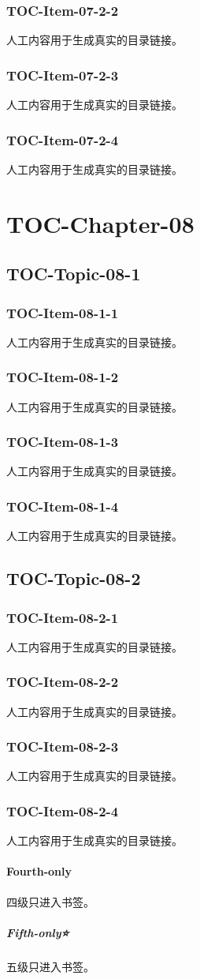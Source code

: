 \subsubsection{TOC-Item-07-2-2}
人工内容用于生成真实的目录链接。
\subsubsection{TOC-Item-07-2-3}
人工内容用于生成真实的目录链接。
\subsubsection{TOC-Item-07-2-4}
人工内容用于生成真实的目录链接。
\section{TOC-Chapter-08}
\subsection{TOC-Topic-08-1}
\subsubsection{TOC-Item-08-1-1}
人工内容用于生成真实的目录链接。
\subsubsection{TOC-Item-08-1-2}
人工内容用于生成真实的目录链接。
\subsubsection{TOC-Item-08-1-3}
人工内容用于生成真实的目录链接。
\subsubsection{TOC-Item-08-1-4}
人工内容用于生成真实的目录链接。
\subsection{TOC-Topic-08-2}
\subsubsection{TOC-Item-08-2-1}
人工内容用于生成真实的目录链接。
\subsubsection{TOC-Item-08-2-2}
人工内容用于生成真实的目录链接。
\subsubsection{TOC-Item-08-2-3}
人工内容用于生成真实的目录链接。
\subsubsection{TOC-Item-08-2-4}
人工内容用于生成真实的目录链接。
\paragraph{Fourth-only}四级只进入书签。
\subparagraph{Fifth-only⭐}五级只进入书签。
